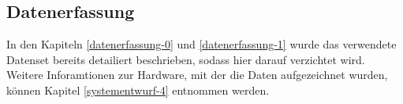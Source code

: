 \subsection{Datenerfassung} \label{datenerfassung-4}


In den Kapiteln \ref{datenerfassung-0} und \ref{datenerfassung-1} wurde das verwendete Datenset bereits detailiert beschrieben, sodass hier darauf verzichtet wird. Weitere Inforamtionen zur Hardware, mit der die Daten aufgezeichnet wurden, k{\"o}nnen Kapitel \ref{systementwurf-4} entnommen werden. \\